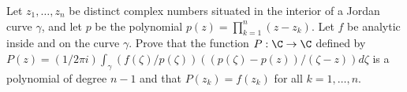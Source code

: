 Let $z_1,\ldots ,z_n$ be distinct complex numbers situated in the
interior of a Jordan curve $\gamma$, and let $p$ be the polynomial
$p(z)=\prod_{k=1}^n(z-z_k)$. Let $f$ be analytic inside and on the
curve $\gamma$. Prove that the function $P:\C\rightarrow \C$ defined
by $P(z)=(1/2\pi
i)\int_{\gamma}(f(\zeta)/p(\zeta))((p(\zeta)-p(z))/(\zeta-z))d\zeta$
is a polynomial of degree $n-1$ and that $P(z_k)=f(z_k)$ for all
$k=1,\ldots ,n$.
